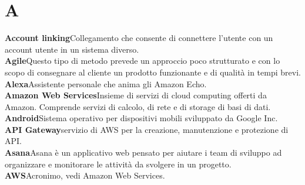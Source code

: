 \newpage
\section{A}\label{l:A}
\textbf{Account linking}\newline Collegamento che consente di connettere l'utente con un account utente in un sistema diverso.\\
\newline
\textbf{Agile}\newline Questo tipo di metodo prevede un approccio poco strutturato e con lo scopo di consegnare al cliente un prodotto funzionante e di qualità in tempi brevi.\\
\newline
\textbf{Alexa}\newline Assistente personale che anima gli Amazon Echo.\\
\newline
\textbf{Amazon Web Services}\newline Insieme di servizi di cloud computing offerti da Amazon. Comprende servizi di calcolo, di rete e di storage di basi di dati.\\
\newline
\textbf{Android}\newline Sistema operativo per dispositivi mobili sviluppato da Google Inc.\\
\newline
\textbf{API Gateway}\newline servizio di AWS per la creazione, manutenzione e protezione di API.\\
\newline
\textbf{Asana}\newline Asana è un applicativo web pensato per aiutare i team di sviluppo ad organizzare e monitorare le attività da svolgere in un progetto.\\
\newline
\textbf{AWS}\newline Acronimo, vedi Amazon Web Services.
